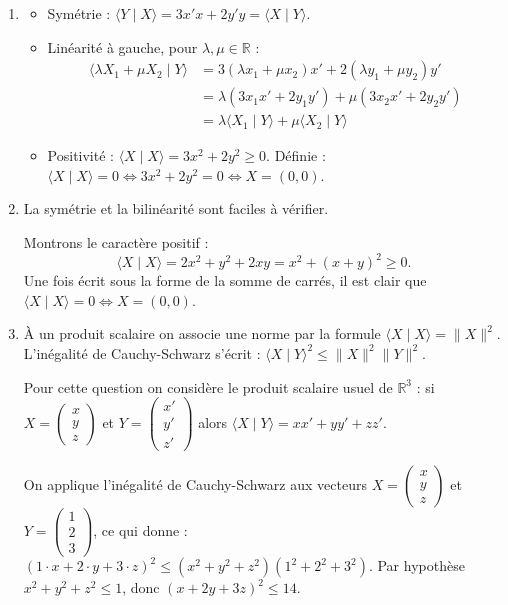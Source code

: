 \documentclass[11pt,a4paper]{article}
\newcommand{\Rr}{\mathbb{R}} \newcommand{\R}{\mathbb{R}}
\renewcommand{\ge}{\geqslant} \renewcommand{\geq}{\geqslant}
\renewcommand{\le}{\leqslant} \renewcommand{\leq}{\leqslant}
\theoremstyle{exostyle}
\begin{document}
\begin{enumerate}
	\item 
	\begin{itemize}
		\item Symétrie : $\langle Y \mid X \rangle = 3x'x+ 2y'y = \langle X \mid Y \rangle $.
		\item Linéarité à gauche, pour $\lambda,\mu\in\Rr$ : 
		\begin{align*}
		\langle \lambda X_1 + \mu X_2 \mid Y \rangle
		&= 3(\lambda x_1+\mu x_2) x'+ 2(\lambda y_1+\mu y_2)y' \\
		&= \lambda (3x_1x'+2y_1y')+\mu(3x_2x'+2y_2y') \\
		&= \lambda \langle X_1 \mid Y \rangle +\mu\langle X_2 \mid Y \rangle 
		\end{align*}
		
		\item Positivité : $\langle X \mid X \rangle = 3x^2+ 2y^2 \ge0$.
		Définie : $\langle X \mid X \rangle = 0 \iff 3x^2+ 2y^2 = 0 \iff X = (0,0)$.
	\end{itemize}
	

	\item La symétrie et la bilinéarité sont faciles à vérifier.
	
	Montrons le caractère positif :
	\[
	\langle X \mid X \rangle = 2x^2+ y^2 + 2xy = x^2 +(x+y)^2 \ge 0. \]
	Une fois écrit sous la forme de la somme de carrés, il est clair que $\langle X \mid X \rangle = 0 \iff X = (0,0)$.

	
	\item À un produit scalaire on associe une norme par la formule $\langle X \mid X \rangle = \| X \|^2$.
	L'inégalité de Cauchy-Schwarz s'écrit : $\langle X \mid Y \rangle^2 \le \| X \|^2 \| Y \|^2$.
	
	Pour cette question on considère le produit scalaire usuel de $\Rr^3$ : si $X = \left(\begin{smallmatrix}x\\y\\z\end{smallmatrix}\right)$ et $Y = \left(\begin{smallmatrix}x'\\y'\\z'\end{smallmatrix}\right)$ alors
	$\langle X \mid Y \rangle = xx'+ yy' + zz'$.
	
	On applique l'inégalité de Cauchy-Schwarz aux vecteurs $X = \left(\begin{smallmatrix}x\\y\\z\end{smallmatrix}\right)$ et $Y = \left(\begin{smallmatrix}1\\2\\3\end{smallmatrix}\right)$, ce qui donne :
	$(1\cdot x + 2\cdot y+3\cdot z)^2 \le (x^2+y^2+z^2)(1^2+2^2+3^2)$.
	Par hypothèse $x^2+y^2+z^2 \le 1$, donc $(x+2y+3z)^2 \le 14$. 
	 
\end{enumerate}
\fincorrection
\end{document}
